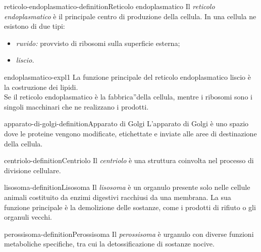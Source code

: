 \documentclass[preview]{standalone}
\begin{document}
\begin{snippetdefinition}{reticolo-endoplasmatico-definition}{Reticolo endoplasmatico}
    Il \textit{reticolo endoplasmatico} è il principale centro di produzione
    della cellula.
    In una cellula ne esistono di due tipi:
    \begin{itemize}
        \item \textit{ruvido:} provvisto di ribosomi sulla superficie esterna;
        \item \textit{liscio.}
    \end{itemize}
\end{snippetdefinition}

\begin{snippet}{endoplasmatico-expl1}
    La funzione principale del reticolo endoplasmatico liscio è
    la costruzione dei lipidi.\\
    Se il reticolo endoplasmatico è la fabbrica”della cellula, mentre i ribosomi sono i singoli macchinari che ne
    realizzano i prodotti.
\end{snippet}

\begin{snippetdefinition}{apparato-di-golgi-definition}{Apparato di Golgi}
    L'apparato di Golgi è uno spazio dove le proteine
    vengono modificate, etichettate e inviate alle aree di destinazione della cellula.
\end{snippetdefinition}


\begin{snippetdefinition}{centriolo-definition}{Centriolo}
    Il \textit{centriolo} è una struttura coinvolta nel processo di divisione cellulare.
\end{snippetdefinition}

\begin{snippetdefinition}{lisosoma-definition}{Lisosoma}
    Il \textit{lisosoma} è un organulo presente solo nelle cellule animali costituito da enzimi digestivi
    racchiusi da una membrana.
    La sua funzione principale è la demolizione delle sostanze,
    come i prodotti di rifiuto o gli organuli vecchi.
\end{snippetdefinition}

\begin{snippetdefinition}{perossisoma-definition}{Perossisoma}
    Il \textit{perossisoma} è urganulo con diverse funzioni metaboliche specifiche, tra cui la detossificazione di
    sostanze nocive.
\end{snippetdefinition}
\end{document}
